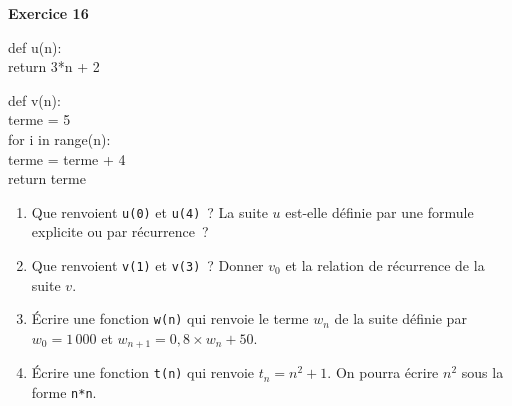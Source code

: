 \documentclass[a4paper,11pt]{article}
\newenvironment{exercice}[1]{%
  \Needspace{6\baselineskip}\par\bigskip\noindent\textbf{Exercice #1}\par\smallskip\noindent\ignorespaces
}{%
  \par
}
\newcommand{\tab}{\hspace*{2em}}
\begin{document}
\begin{exercice}{16}
\begin{minipage}[t]{0.4\linewidth}
\vspace{0pt}
\begin{python}
  def u(n):\\
  \tab return 3*n + 2
\end{python}
\begin{python}
  def v(n):\\
  \tab terme = 5\\
  \tab for i in range(n):\\
  \tab\tab terme = terme + 4\\
  \tab return terme
\end{python}
\end{minipage}
\hfill
\begin{minipage}[t]{0.56\linewidth}
\vspace{0pt}
\begin{enumerate}[label=\arabic*.]
\item Que renvoient \texttt{u(0)} et \texttt{u(4)}~? La suite $u$ est-elle définie par une formule explicite ou par récurrence~?
\item Que renvoient \texttt{v(1)} et \texttt{v(3)}~? Donner $v_0$ et la relation de récurrence de la suite $v$.
\item Écrire une fonction \texttt{w(n)} qui renvoie le terme $w_n$ de la suite définie par $w_0 = 1\,000$ et $w_{n+1} = 0{,}8 \times w_n + 50$.
\item Écrire une fonction \texttt{t(n)} qui renvoie $t_n = n^2 + 1$. On pourra écrire $n^2$ sous la forme \texttt{n*n}.
\end{enumerate}
\end{minipage}
\end{exercice}
\end{document}
